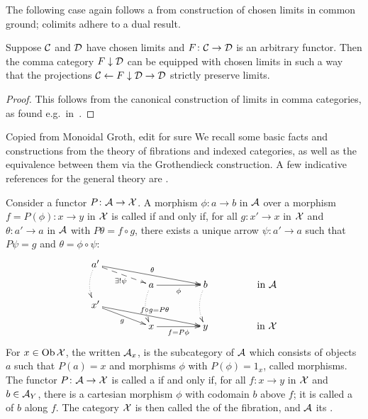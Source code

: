 \documentclass{amsart}
\begin{document}
The following case again follows a from construction of chosen limits in common ground; colimits adhere to a dual result.
\begin{lem}
Suppose $\mathcal{C}$ and $\mathcal{D}$ have chosen limits and $F\colon\mathcal{C}\to\mathcal{D}$ is an arbitrary functor. Then the comma category $F\downarrow\mathcal{D}$ can be equipped with chosen limits in such a way that the projections $\mathcal{C}\leftarrow F\downarrow\mathcal{D}\to\mathcal{D}$ strictly preserve limits.
\end{lem}

\begin{proof}
 This follows from the canonical construction of limits in comma categories, as found e.g.\ in~\cite[\S 2.16]{Handbook1}.
\end{proof}



{\chris Copied from Monoidal Groth, edit for sure}
We recall some basic facts and constructions from the theory of fibrations and indexed categories, as well as the equivalence between them via the Grothendieck construction.
A few indicative references for the general theory are \cite{Grayfibredandcofibred,FibredAdjunctions,Handbook2,Jacobs,Elephant1}.

Consider a functor $P \colon\mathcal{A} \to \mathcal{X}$. A morphism $\phi \colon a \to b$ in $\mathcal{A} $ over a morphism $f = P(\phi) \colon x \to y$ in $\mathcal{X}$ is called  if and only if, for all $g \colon x' \to x$ in $\mathcal{X}$ and $\theta \colon a'\to a$ in $\mathcal{A} $ with $P \theta = f \circ g$, there exists a unique arrow $\psi \colon a'\to a$ such that $P \psi = g$ and $\theta = \phi \circ \psi$:
\begin{equation}
    \xymatrix @R=.1in @C=.6in
    {a'\ar [drr]^-{\theta}\ar @{-->}[dr]_-{\exists!\psi} 
    \ar @{.>}@/_/[dd] &&& \\
    & a\ar[r]_-{\phi} \ar @{.>}@/_/[dd] & 
    b \ar @{.>}@/_/[dd] & \textrm{in }\A \\
    x'\ar [drr]^-{f\circ g=P\theta}\ar[dr]_-g &&&\\
    & x\ar[r]_-{f=P\phi} & y & \textrm{in }\X}\label{eq:13}
\end{equation}
For $x \in \operatorname{Ob}\mathcal{X}$, the  written $\mathcal{A}_x$, is the subcategory of $\mathcal{A}$ which consists of objects $a$ such that $P(a) = x$ and morphisms $\phi$ with $P(\phi) = 1_x$, called  morphisms. The functor $P \colon \mathcal{A} \to \mathcal{X}$ is called a  if and only if, for all $f \colon x \to y$ in $\mathcal{X}$ and $b\in\mathcal{A}_Y$, there is a cartesian morphism $\phi$ with codomain $b$ above $f$; it is called a  of $b$ along $f$. The category $\mathcal{X}$ is then called the  of the fibration, and $\mathcal{A} $ its .
\end{document}
